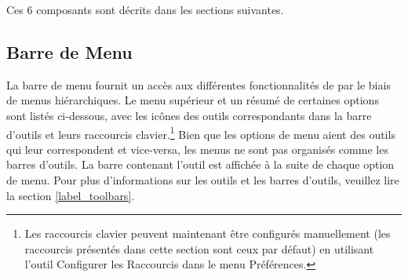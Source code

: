 Ces 6 composants sont décrits dans les sections suivantes.

\subsection{Barre de Menu}\label{label_menubar}

La barre de menu fournit un accès aux différentes fonctionnalités de \qg par le biais de menus hiérarchiques. Le menu supérieur et un résumé de certaines options sont listés ci-dessous, avec les icônes des outils correspondants dans la barre d'outils et leurs raccourcis clavier.\footnote{Les raccourcis clavier peuvent maintenant être configurés manuellement (les raccourcis présentés dans cette section sont ceux par défaut) en utilisant l'outil Configurer les Raccourcis dans le menu Préférences.} Bien que les options de menu aient des outils qui leur correspondent et vice-versa, les menus ne sont pas organisés comme les barres d'outils. La barre contenant l'outil est affichée à la suite de chaque option de menu. Pour plus d'informations sur les outils et les barres d'outils, veuillez lire la section \ref{label_toolbars}.

